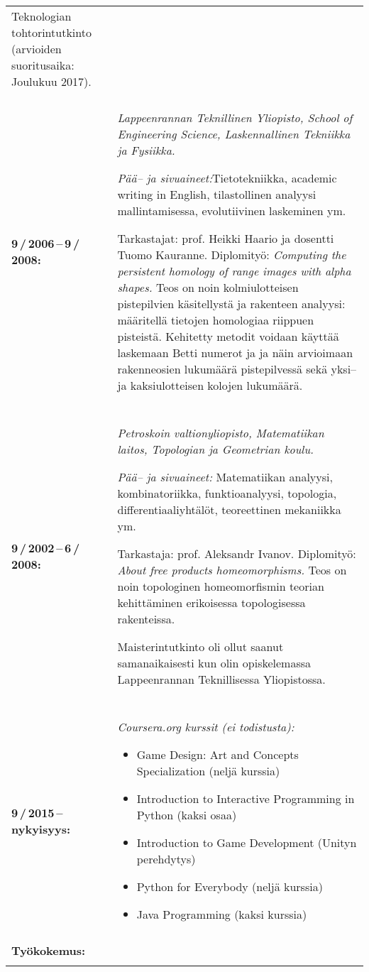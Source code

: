 \documentclass[a4paper]{article}
\begin{document}
\begin{longtable}{p{} p{}}
  Teknologian tohtorintutkinto (arvioiden suoritusaika: Joulukuu 2017).
\\
&\\
\textbf{9\,/\,2006\,--\,9\,/\,2008:} &
  \textmd{\textsl{Lappeenrannan Teknillinen Yliopisto, School of Engineering
  Science, Laskennallinen Tekniikka ja Fysiikka.}}

  \textit{P\"a\"a-- ja sivuaineet:}Tietotekniikka, academic writing in English,
  tilastollinen analyysi mallintamisessa, evolutiivinen laskeminen ym.

  Tarkastajat: prof. Heikki Haario ja dosentti Tuomo Kauranne.
  Diplomity\"o: \emph{Computing the persistent homology of range images with
  alpha shapes.}
  Teos on noin kolmiulotteisen pistepilvien k\"asitellyst\"a ja
  rakenteen analyysi: m\"a\"aritell\"a tietojen homologiaa riippuen pisteist\"a.
  Kehitetty metodit voidaan k\"aytt\"a\"a laskemaan Betti numerot ja ja n\"ain
  arvioimaan rakenneosien lukum\"a\"ar\"a pistepilvess\"a sek\"a yksi-- ja
  kaksiulotteisen kolojen lukum\"a\"ar\"a.\\

&\\
\textbf{9\,/\,2002\,--\,6\,/\,2008:} &
  \textmd{\textsl{Petroskoin valtionyliopisto, Matematiikan laitos, Topologian
    ja Geometrian koulu.}}

  \textit{P\"a\"a-- ja sivuaineet:} Matematiikan analyysi, kombinatoriikka,
  funktioanalyysi, topologia, differentiaaliyht\"al\"ot, teoreettinen mekaniikka
  ym.

  Tarkastaja: prof. Aleksandr Ivanov.
  Diplomity\"o: \emph{About free products homeomorphisms.}
  Teos on noin topologinen homeomorfismin teorian kehitt\"aminen erikoisessa
  topologisessa rakenteissa.

  Maisterintutkinto oli ollut saanut samanaikaisesti kun olin opiskelemassa
  Lappeenrannan Teknillisessa Yliopistossa.\\

& \\
\textbf{9\,/\,2015\,--\,nykyisyys:} &
\textmd{\textsl{Coursera.org kurssit (ei todistusta):}}

  \vspace{-10pt}
  \begin{itemize}
    \setlength\itemsep{-3pt}
    \item Game Design: Art and Concepts Specialization (nelj\"a kurssia)
    \item Introduction to Interactive Programming in Python (kaksi osaa)
    \item Introduction to Game Development (Unityn perehdytys)
    \item Python for Everybody (nelj\"a kurssia)
    \item Java Programming (kaksi kurssia)
  \end{itemize}
\\
& \\
\multicolumn{2}{l}{\cellcolor{myGray}\textbf{Ty\"okokemus:}}\\
& \\


\end{longtable}
\end{document}
